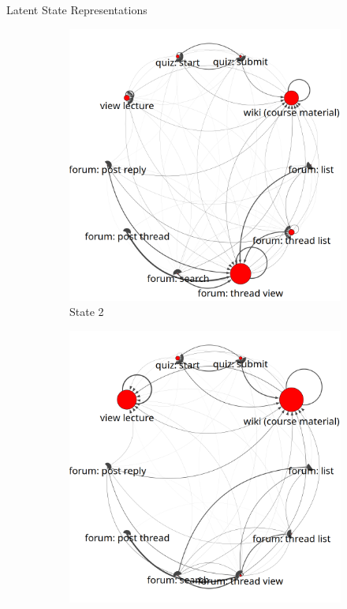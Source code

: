 \documentclass[final,t]{beamer}
\begin{document}
\begin{frame}[fragile]
\begin{columns}[t]
\begin{column}{0.3\textwidth}
\begin{block}{Latent State Representations}
\begin{figure}
          \begin{subfigure}[t]{0.9\textwidth}
            \includegraphics[width=\textwidth]{../../figures/text-4state/state2.png}
            \caption{\label{fig:state2}State 2}
          \end{subfigure}
          \begin{subfigure}[t]{0.9\textwidth}
            \includegraphics[width=\textwidth]{../../figures/text-4state/state3.png}

\end{subfigure}
\end{figure}
\end{block}
\end{column}
\end{columns}
\end{frame}
\end{document}
